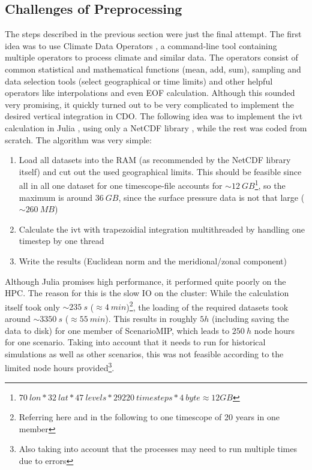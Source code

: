 \subsection{Challenges of Preprocessing}
\label{sec:preprocessing challanges}

The steps described in the previous section were just the final attempt. 
The first idea was to use Climate Data Operators \cite{schulzweida2024}, a command-line tool containing multiple operators to process climate and similar data. 
The operators consist of common statistical and mathematical functions (mean, add, sum), sampling and data selection tools (select geographical or time limits) and other helpful operators like interpolations and even EOF calculation. 
Although this sounded very promising, it quickly turned out to be very complicated to implement the desired vertical integration in CDO.
The following idea was to implement the \ac{ivt} calculation in Julia \cite{gao_julia_2020}, using only a NetCDF library \cite{barth_ncdatasetsjl_2024}, while the rest was coded from scratch. 
The algorithm was very simple: 

\begin{enumerate}[itemsep=0mm]
  \item Load all datasets into the RAM (as recommended by the NetCDF library itself) and cut out the used geographical limits. This should be feasible since all in all one dataset for one timescope-file accounts for $\sim 12~GB$\footnote{$70~lon * 32~lat * 47~levels * 29220~timesteps * 4~byte \approx 12 GB$}, so the maximum is around $36~GB$, since the surface pressure data is not that large ($\sim 260~MB$)   
  \item Calculate the \ac{ivt} with trapezoidial integration multithreaded by handling one time\-step by one thread
  \item Write the results (Euclidean norm and the meridional/zonal component)
\end{enumerate}

Although Julia promises high performance, it performed quite poorly on the HPC.
The reason for this is the slow IO on the cluster: While the calculation itself took only $\sim 235~s$ ($\approx 4~min$)\footnote{Referring here and  in the following to one timescope of 20 years in one member}, the loading of the required datasets took around $\sim 3350~s$ ($\approx 55~min$). 
This results in roughly $5 h$ (including saving the data to disk) for one member of ScenarioMIP, which leads to $250~h$ node hours for one scenario. 
Taking into account that it needs to run for historical simulations as well as other scenarios, this was not feasible according to the limited node hours provided\footnote{Also taking into account that the processes may need to run multiple times due to errors}.

